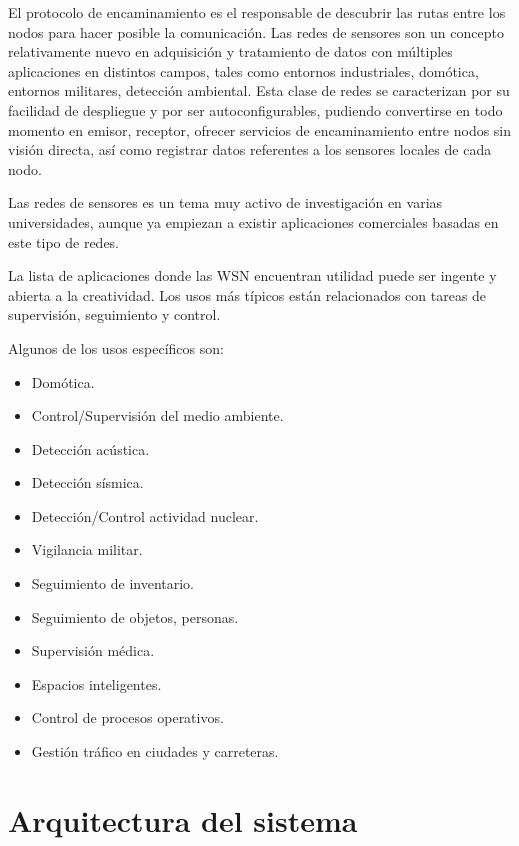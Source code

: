 El protocolo de encaminamiento es el responsable de descubrir las rutas entre los nodos para hacer posible la
comunicaci\'on. Las redes de sensores son un concepto relativamente nuevo en adquisici\'on y tratamiento de datos con m\'ultiples aplicaciones en distintos campos, tales como entornos industriales, dom\'otica, entornos militares, detecci\'on ambiental. Esta clase de redes se caracterizan por su facilidad de despliegue y por ser autoconfigurables, pudiendo convertirse en todo momento en emisor, receptor, ofrecer servicios de encaminamiento entre nodos sin visi\'on directa, as\'i como registrar datos referentes a los sensores locales de cada nodo.


Las redes de sensores es un tema muy activo de investigaci\'on en varias universidades, aunque ya empiezan a existir aplicaciones comerciales basadas en este tipo de redes. 


La lista de aplicaciones donde las WSN encuentran utilidad puede ser ingente y abierta a la creatividad. Los usos m\'as t\'ipicos est\'an relacionados con tareas de supervisi\'on, seguimiento y control. 



Algunos de los usos espec\'ificos son:

\begin{itemize}
\item Dom\'otica.
\item Control/Supervisi\'on del medio ambiente.
\item Detecci\'on ac\'ustica.
\item Detecci\'on s\'ismica.
\item Detecci\'on/Control actividad nuclear.
\item Vigilancia militar.
\item Seguimiento de inventario.
\item Seguimiento de objetos, personas.
\item Supervisi\'on m\'edica.
\item Espacios inteligentes.
\item Control de procesos operativos.
\item Gesti\'on tr\'afico en ciudades y carreteras.
\end{itemize}

 

\section{Arquitectura del sistema}

